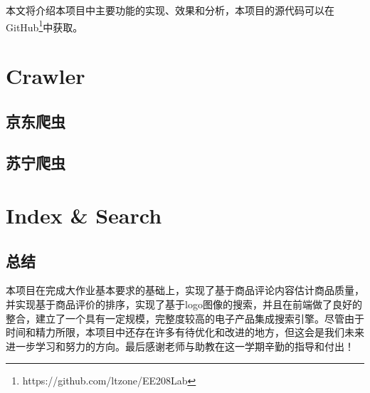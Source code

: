 \documentclass{book}
\begin{document}
本文将介绍本项目中主要功能的实现、效果和分析，本项目的源代码可以在GitHub\footnote{https://github.com/ltzone/EE208Lab}中获取。

\mainmatter


\part{Crawler}

\chapter{京东爬虫}





\chapter{苏宁爬虫}







\part{Index \& Search}



\backmatter


\chapter{总结}

本项目在完成大作业基本要求的基础上，实现了基于商品评论内容估计商品质量，并实现基于商品评价的排序，实现了基于logo图像的搜索，并且在前端做了良好的整合，建立了一个具有一定规模，完整度较高的电子产品集成搜索引擎。尽管由于时间和精力所限，本项目中还存在许多有待优化和改进的地方，但这会是我们未来进一步学习和努力的方向。最后感谢老师与助教在这一学期辛勤的指导和付出！
\end{document}
